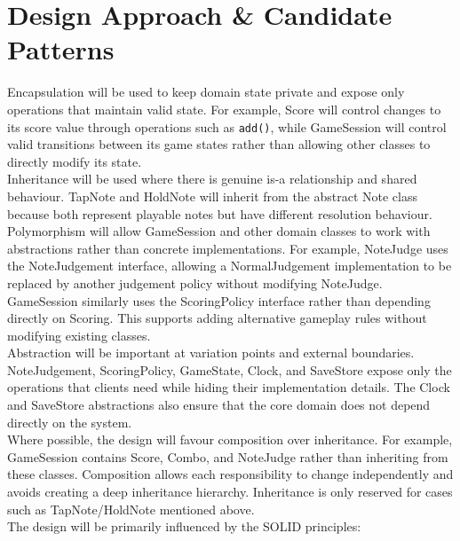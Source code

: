 \documentclass[12pt,a4paper]{article}
\newcommand\tab[1][1cm]{\hspace*{#1}}
\begin{document}
\section{Design Approach \& Candidate Patterns}
    \tab Encapsulation will be used to keep domain state private and expose only operations that maintain valid state.
    For example, Score will control changes to its score value through operations such as \texttt{add()}, while GameSession will control valid transitions between its game states rather than allowing other classes to directly modify its state. \\
    \tab Inheritance will be used where there is genuine is-a relationship and shared behaviour.
    TapNote and HoldNote will inherit from the abstract Note class because both represent playable notes but have different resolution behaviour. \\
    \tab Polymorphism will allow GameSession and other domain classes to work with abstractions rather than concrete implementations.
    For example, NoteJudge uses the NoteJudgement interface, allowing a NormalJudgement implementation to be replaced by another judgement policy without modifying NoteJudge.
    GameSession similarly uses the ScoringPolicy interface rather than depending directly on Scoring.
    This supports adding alternative gameplay rules without modifying existing classes. \\
    \tab Abstraction will be important at variation points and external boundaries.
    NoteJudgement, ScoringPolicy, GameState, Clock, and SaveStore expose only the operations that clients need while hiding their implementation details.
    The Clock and SaveStore abstractions also ensure that the core domain does not depend directly on the system. \\
    \tab Where possible, the design will favour composition over inheritance.
    For example, GameSession contains Score, Combo, and NoteJudge rather than inheriting from these classes.
    Composition allows each responsibility to change independently and avoids creating a deep inheritance hierarchy.
    Inheritance is only reserved for cases such as TapNote/HoldNote mentioned above. \\
    \tab The design will be primarily influenced by the SOLID principles:
\end{document}
